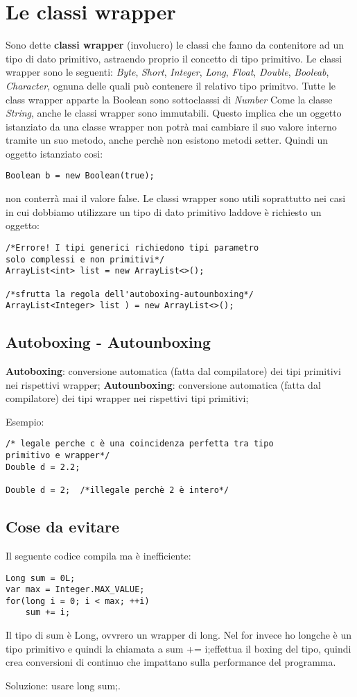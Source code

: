 \section{Le classi wrapper}
Sono dette \textbf{classi wrapper} (involucro) le classi che fanno da contenitore ad un tipo di dato primitivo, astraendo proprio il concetto di tipo primitivo.
Le classi wrapper sono le seguenti: \textit{Byte}, \textit{Short}, \textit{Integer}, \textit{Long}, \textit{Float}, \textit{Double}, \textit{Booleab}, \textit{Character}, ognuna delle quali può contenere il relativo tipo primitvo.
Tutte le class wrapper apparte la Boolean sono sottoclasssi di \textit{Number}
Come la classe \textit{String}, anche le classi wrapper sono immutabili. Questo implica che un oggetto istanziato da una classe wrapper non potrà mai cambiare il suo valore interno tramite un suo metodo, anche perchè non esistono metodi setter. Quindi un oggetto istanziato cosi:
\begin{lstlisting}
Boolean b = new Boolean(true);
\end{lstlisting}
non conterrà mai il valore false.
Le classi wrapper sono utili soprattutto nei casi in cui dobbiamo utilizzare un tipo di dato primitivo laddove è richiesto un oggetto:
\begin{lstlisting}
/*Errore! I tipi generici richiedono tipi parametro 
solo complessi e non primitivi*/
ArrayList<int> list = new ArrayList<>(); 

/*sfrutta la regola dell'autoboxing-autounboxing*/
ArrayList<Integer> list ) = new ArrayList<>(); 
\end{lstlisting}
\subsection{Autoboxing - Autounboxing}
\textbf{Autoboxing}: conversione automatica (fatta dal compilatore) dei tipi primitivi nei rispettivi wrapper;
\textbf{Autounboxing}: conversione automatica (fatta dal compilatore) dei tipi wrapper nei rispettivi tipi primitivi;

Esempio:
\begin{lstlisting}
/* legale perche c è una coincidenza perfetta tra tipo 
primitivo e wrapper*/
Double d = 2.2; 

Double d = 2;  /*illegale perchè 2 è intero*/
\end{lstlisting}

\subsection{Cose da evitare}
Il seguente codice compila ma è inefficiente:
\begin{lstlisting}
Long sum = 0L;
var max = Integer.MAX_VALUE;
for(long i = 0; i < max; ++i)
	sum += i;
\end{lstlisting}
Il tipo di sum è Long, ovvrero un wrapper di long. Nel for invece ho longche è un tipo primitivo e quindi la chiamata a sum += i;effettua il boxing del tipo, quindi crea conversioni di continuo che impattano sulla performance del programma. 

Soluzione: usare long sum;.